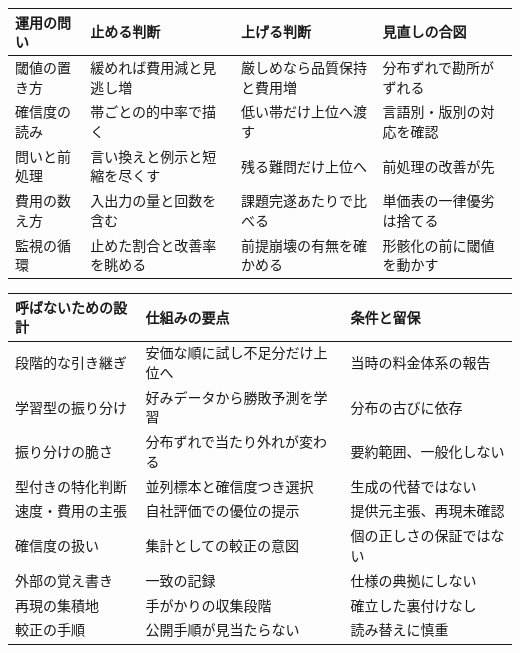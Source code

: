\documentclass[lualatex,a4paper,10pt]{jlreq}
\begin{document}
\begin{center}
\small
\begin{tabularx}{\textwidth}{@{}p{}p{}p{}X@{}}
\toprule
運用の問い & 止める判断 & 上げる判断 & 見直しの合図 \\
\midrule
閾値の置き方 & 緩めれば費用減と見逃し増 & 厳しめなら品質保持と費用増 & 分布ずれで勘所がずれる \\
確信度の読み & 帯ごとの的中率で描く & 低い帯だけ上位へ渡す & 言語別・版別の対応を確認 \\
問いと前処理 & 言い換えと例示と短縮を尽くす & 残る難問だけ上位へ & 前処理の改善が先 \\
費用の数え方 & 入出力の量と回数を含む & 課題完遂あたりで比べる & 単価表の一律優劣は捨てる \\
監視の循環 & 止めた割合と改善率を眺める & 前提崩壊の有無を確かめる & 形骸化の前に閾値を動かす \\
\bottomrule
\end{tabularx}
\end{center}
\autocite{frugalgpt,routellm,fragility,sysoneconcepts,jevmodels}

\begin{center}
\small
\begin{tabularx}{\textwidth}{@{}p{}p{}X@{}}
\toprule
呼ばないための設計 & 仕組みの要点 & 条件と留保 \\
\midrule
段階的な引き継ぎ & 安価な順に試し不足分だけ上位へ & 当時の料金体系の報告 \\
学習型の振り分け & 好みデータから勝敗予測を学習 & 分布の古びに依存 \\
振り分けの脆さ & 分布ずれで当たり外れが変わる & 要約範囲、一般化しない \\
型付きの特化判断 & 並列標本と確信度つき選択 & 生成の代替ではない \\
速度・費用の主張 & 自社評価での優位の提示 & 提供元主張、再現未確認 \\
確信度の扱い & 集計としての較正の意図 & 個の正しさの保証ではない \\
外部の覚え書き & 一致の記録 & 仕様の典拠にしない \\
再現の集積地 & 手がかりの収集段階 & 確立した裏付けなし \\
較正の手順 & 公開手順が見当たらない & 読み替えに慎重 \\
\bottomrule
\end{tabularx}
\end{center}
\autocite{frugalgpt,routellm,fragility,sysone,jevmodels}
\end{document}
